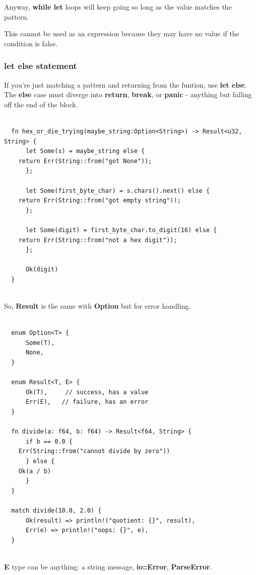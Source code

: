 \documentclass[11pt]{article}
\begin{document}
Anyway, \textbf{while let} loops will keep going so long as the value matches the pattern.

This cannot be used as an expression because they may have no value if the condition is false.
\subsubsection{let else statement}
\label{sec:orgfa06b6c}

If you're just matching a pattern and returning from the funtion, use \textbf{let else}.
The \textbf{else} case must diverge into \textbf{return}, \textbf{break}, or \textbf{panic} - anything but falling off the end of the block.

\begin{verbatim}

  fn hex_or_die_trying(maybe_string:Option<String>) -> Result<u32, String> {
      let Some(s) = maybe_string else {
  	return Err(String::from("got None"));
      };

      let Some(first_byte_char) = s.chars().next() else {
  	return Err(String::from("got empty string"));
      };

      let Some(digit) = first_byte_char.to_digit(16) else {
  	return Err(String::from("not a hex digit"));
      };

      Ok(digit)
  }


\end{verbatim}



So, \textbf{Result} is the same with \textbf{Option} but for error handling.

\begin{verbatim}

  enum Option<T> {
      Some(T),
      None,
  }

  enum Result<T, E> {
      Ok(T),     // success, has a value 
      Err(E),   // failure, has an error
  }

  fn divide(a: f64, b: f64) -> Result<f64, String> {
      if b == 0.0 {
  	Err(String::from("cannot divide by zero"))
      } else {
  	Ok(a / b)
      }
  }

  match divide(10.0, 2.0) {
      Ok(result) => println!("quotient: {}", result),
      Err(e) => println!("oops: {}", e),
  }


\end{verbatim}

\textbf{E} type can be anything: a string message, \textbf{io::Error}, \textbf{ParseError}.
\end{document}
